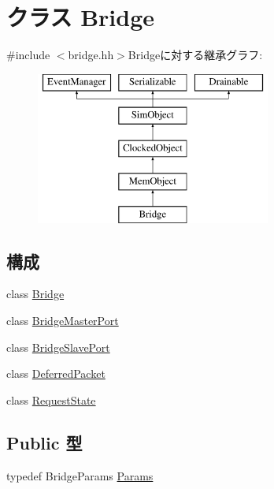 \hypertarget{classBridge}{
\section{クラス Bridge}
\label{classBridge}
}


{\ttfamily \#include $<$bridge.hh$>$}Bridgeに対する継承グラフ:\begin{figure}[H]
\begin{center}
\leavevmode
\includegraphics[height=5cm]{classBridge}
\end{center}
\end{figure}
\subsection*{構成}
\begin{DoxyCompactItemize}
\item 
class \hyperlink{classBridge_1_1Bridge}{Bridge}
\item 
class \hyperlink{classBridge_1_1BridgeMasterPort}{BridgeMasterPort}
\item 
class \hyperlink{classBridge_1_1BridgeSlavePort}{BridgeSlavePort}
\item 
class \hyperlink{classBridge_1_1DeferredPacket}{DeferredPacket}
\item 
class \hyperlink{classBridge_1_1RequestState}{RequestState}
\end{DoxyCompactItemize}
\subsection*{Public 型}
\begin{DoxyCompactItemize}
\item 
typedef BridgeParams \hyperlink{classBridge_aff1c1420f91a1e81dfd9dc93d1fd470f}{Params}
\end{DoxyCompactItemize}
